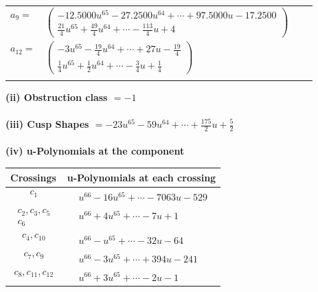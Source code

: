 \documentclass[1p]{elsarticle_modified}
\theoremstyle{definition}
\begin{document}
\begin{tabular}{m{7pt} m{180pt} m{7pt} m{180pt} }
\flushright $a_{9}=$&$\begin{pmatrix}-12.5000 u^{65}-27.2500 u^{64}+\cdots+97.5000 u-17.2500\\\frac{21}{4} u^{65}+\frac{49}{4} u^{64}+\cdots-\frac{113}{4} u+4\end{pmatrix}$ \\
\flushright $a_{12}=$&$\begin{pmatrix}-3 u^{65}-\frac{19}{4} u^{64}+\cdots+27 u-\frac{19}{4}\\\frac{1}{4} u^{65}+\frac{1}{2} u^{64}+\cdots-\frac{3}{4} u+\frac{1}{4}\end{pmatrix}$\\&\end{tabular}
\flushleft \textbf{(ii) Obstruction class $= -1$}\\~\\
\flushleft \textbf{(iii) Cusp Shapes $= -23 u^{65}-59 u^{64}+\cdots+\frac{175}{2} u+\frac{5}{2}$}\\~\\
\newpage\renewcommand{\arraystretch}{1}
\flushleft \textbf{(iv) u-Polynomials at the component}\newline \\
\begin{tabular}{m{50pt}|m{274pt}}
Crossings & \hspace{64pt}u-Polynomials at each crossing \\
\hline $$\begin{aligned}c_{1}\end{aligned}$$&$\begin{aligned}
&u^{66}-16 u^{65}+\cdots-7063 u-529
\end{aligned}$\\
\hline $$\begin{aligned}c_{2},c_{3},c_{5}\\c_{6}\end{aligned}$$&$\begin{aligned}
&u^{66}+4 u^{65}+\cdots-7 u+1
\end{aligned}$\\
\hline $$\begin{aligned}c_{4},c_{10}\end{aligned}$$&$\begin{aligned}
&u^{66}- u^{65}+\cdots-32 u-64
\end{aligned}$\\
\hline $$\begin{aligned}c_{7},c_{9}\end{aligned}$$&$\begin{aligned}
&u^{66}-3 u^{65}+\cdots+394 u-241
\end{aligned}$\\
\hline $$\begin{aligned}c_{8},c_{11},c_{12}\end{aligned}$$&$\begin{aligned}
&u^{66}+3 u^{65}+\cdots-2 u-1
\end{aligned}$\\
\hline
\end{tabular}\\~\\
\end{document}
